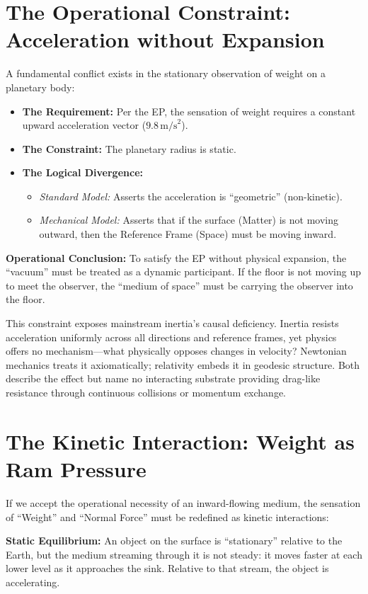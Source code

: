 \documentclass[11pt,a4paper]{article}
\begin{document}
\section{The Operational Constraint: Acceleration without Expansion}
A fundamental conflict exists in the stationary observation of weight on a planetary body:
\begin{itemize}
    \item \textbf{The Requirement:} Per the EP, the sensation of weight requires a constant upward acceleration vector ($9.8\,\text{m/s}^2$).
    \item \textbf{The Constraint:} The planetary radius is static.
    \item \textbf{The Logical Divergence:}
    \begin{itemize}
        \item \textit{Standard Model:} Asserts the acceleration is ``geometric'' (non-kinetic).
        \item \textit{Mechanical Model:} Asserts that if the surface (Matter) is not moving outward, then the Reference Frame (Space) must be moving inward.
    \end{itemize}
\end{itemize}

\textbf{Operational Conclusion:} To satisfy the EP without physical expansion, the ``vacuum'' must be treated as a dynamic participant. If the floor is not moving up to meet the observer, the ``medium of space'' must be carrying the observer into the floor.

This constraint exposes mainstream inertia's causal deficiency. Inertia resists acceleration uniformly across all directions and reference frames, yet physics offers no mechanism---what physically opposes changes in velocity? Newtonian mechanics treats it axiomatically; relativity embeds it in geodesic structure. Both describe the effect but name no interacting substrate providing drag-like resistance through continuous collisions or momentum exchange.

\section{The Kinetic Interaction: Weight as Ram Pressure}
If we accept the operational necessity of an inward-flowing medium, the sensation of ``Weight'' and ``Normal Force'' must be redefined as kinetic interactions:

\textbf{Static Equilibrium:} An object on the surface is ``stationary'' relative to the Earth, but the medium streaming through it is not steady: it moves faster at each lower level as it approaches the sink. Relative to that stream, the object is accelerating.
\end{document}
